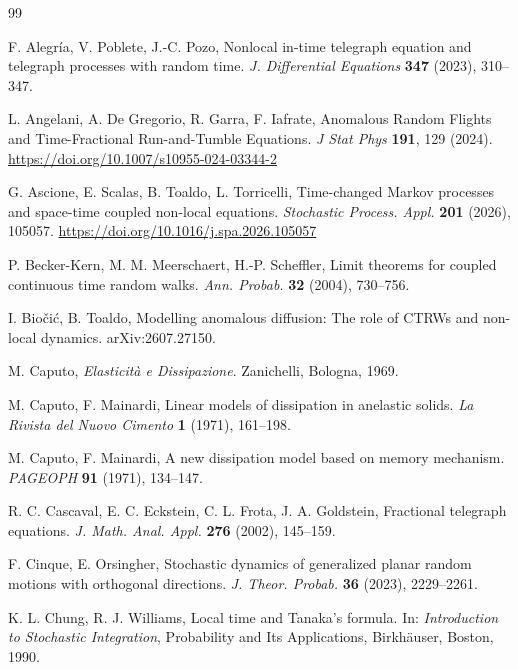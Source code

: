 \documentclass[10pt,a4paper]{article}
\numberwithin{equation}{section}
\theoremstyle{plain}
\theoremstyle{remark}
\begin{document}
\begin{thebibliography}{99}

F. Alegr\'{i}a, V. Poblete, J.-C. Pozo,
Nonlocal in-time telegraph equation and telegraph processes with random time.
\textit{J. Differential Equations} \textbf{347} (2023), 310--347.

L. Angelani, A. De Gregorio, R. Garra, F. Iafrate, 
Anomalous Random Flights and Time-Fractional Run-and-Tumble Equations.
\textit{J Stat Phys} \textbf{191}, 129 (2024). 
\url{https://doi.org/10.1007/s10955-024-03344-2}


G. Ascione, E. Scalas, B. Toaldo, L. Torricelli,
Time-changed Markov processes and space-time coupled non-local equations.
\textit{Stochastic Process. Appl.} \textbf{201} (2026), 105057.
\url{https://doi.org/10.1016/j.spa.2026.105057}


P. Becker-Kern, M. M. Meerschaert, H.-P. Scheffler,
Limit theorems for coupled continuous time random walks.
\textit{Ann. Probab.} \textbf{32} (2004), 730--756.

I. Bio\v{c}i\'{c}, B. Toaldo,
Modelling anomalous diffusion: The role of CTRWs and non-local dynamics.
arXiv:2607.27150.

M. Caputo,
\textit{Elasticit\`a e Dissipazione}.
Zanichelli, Bologna, 1969.

M. Caputo, F. Mainardi,
Linear models of dissipation in anelastic solids.
\textit{La Rivista del Nuovo Cimento} \textbf{1} (1971), 161--198.

M. Caputo, F. Mainardi,
A new dissipation model based on memory mechanism.
\textit{PAGEOPH} \textbf{91} (1971), 134--147.

R. C. Cascaval, E. C. Eckstein, C. L. Frota, J. A. Goldstein,
Fractional telegraph equations.
\textit{J. Math. Anal. Appl.} \textbf{276} (2002), 145--159.

F. Cinque, E. Orsingher,
Stochastic dynamics of generalized planar random motions with orthogonal directions.
\textit{J. Theor. Probab.} \textbf{36} (2023), 2229--2261.

K. L. Chung, R. J. Williams,
Local time and Tanaka's formula.
In: \textit{Introduction to Stochastic Integration},
Probability and Its Applications,
Birkh\"auser, Boston, 1990.


\end{thebibliography}
\end{document}
